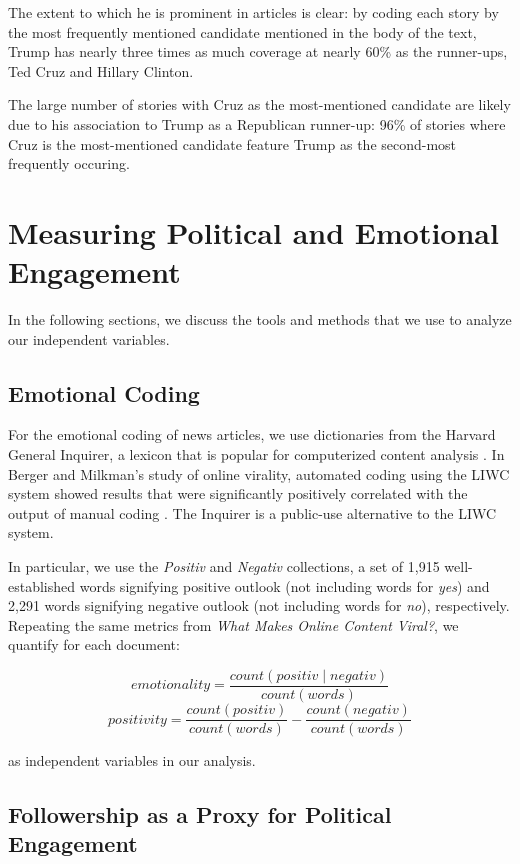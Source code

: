 \documentclass[letterpaper]{article}
\begin{document}
The extent to which he is prominent in articles is clear: by coding each story by the most frequently mentioned candidate mentioned in the body of the text, Trump has nearly three times as much coverage at nearly 60\% as the runner-ups, Ted Cruz and Hillary Clinton.

The large number of stories with Cruz as the most-mentioned candidate are likely due to his association to Trump as a Republican runner-up: 96\% of stories where Cruz is the most-mentioned candidate feature Trump as the second-most frequently occuring.
 

\section{Measuring Political and Emotional Engagement}

In the following sections, we discuss the tools and methods that we use to analyze our independent variables.

\subsection{Emotional Coding}
For the emotional coding of news articles, we use dictionaries from the Harvard General Inquirer, a lexicon that is popular for computerized content analysis \cite{stone1963computer}. In Berger and Milkman’s study of online virality, automated coding using the LIWC system showed results that were significantly positively correlated with the output of manual coding \cite{berger2012makes}. The Inquirer is a public-use alternative to the LIWC system. 

In particular, we use the \emph{Positiv} and \emph{Negativ} collections, a set of 1,915 well-established words signifying positive outlook (not including words for \emph{yes}) and 2,291 words signifying negative outlook (not including words for \emph{no}), respectively. Repeating the same metrics from \emph{What Makes Online Content Viral?}, we quantify for each document:

$$ emotionality = \frac{count(positiv \mid negativ)}{count(words)}$$
$$ positivity = \frac{count(positiv)}{count(words)} - \frac{count(negativ)}{count(words)}$$

as independent variables in our analysis.

 \subsection{Followership as a Proxy for Political Engagement}
\end{document}
